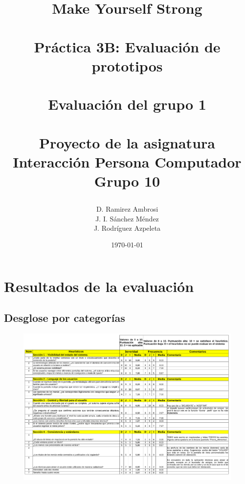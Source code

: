 \documentclass[a4paper]{article}
\date{}
\author{D. Ramirez Ambrosi \\ J. I. Sánchez Méndez \\ J. Rodríguez Azpeleta}
\title{\begin{center}
\textbf{\Huge{Make Yourself Strong}} \\ \ \\ Práctica 3B: Evaluación de prototipos \\ \ \\ {\Huge{Evaluación del grupo 1}}  \\ \ \\ Proyecto de la asignatura Interacción Persona Computador \\ \Huge{Grupo 10}
\end{center}}
\date{\today}
\renewcommand\listfigurename{\centering LISTA DE FIGURAS}
\begin{document}
\maketitle

\thispagestyle{empty}%
\newpage
\tableofcontents%
\thispagestyle{empty}
\newpage





\setcounter{page}{1}%


\section{Resultados de la evaluación}

\subsection{Desglose por categorías}

\begin{figure}[!h]
\centering
\includegraphics[width=0.9\textheight,angle=90,page=1]{./figuras/checklist.pdf}
\end{figure}
\end{document}
